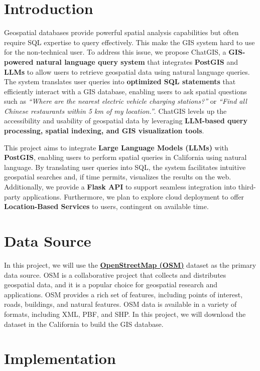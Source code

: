 \documentclass{article}
\begin{document}
\section{Introduction}

Geospatial databases provide powerful spatial analysis capabilities but often require SQL expertise to query effectively. This make the GIS system hard to use for the non-technical user. To address this issue, we propose ChatGIS, a \textbf{GIS-powered natural language query system} that integrates \textbf{PostGIS} and \textbf{LLMs} to allow users to retrieve geospatial data using natural language queries. The system translates user queries into \textbf{optimized SQL statements} that efficiently interact with a GIS database, enabling users to ask spatial questions such as \textit{``Where are the nearest electric vehicle charging stations?''} or \textit{``Find all Chinese restaurants within 5 km of my location.''}. ChatGIS levels up the accessibility and usability of geospatial data by leveraging \textbf{LLM-based query processing, spatial indexing, and GIS visualization tools}.

This project aims to integrate \textbf{Large Language Models (LLMs)} with \textbf{PostGIS}, enabling users to perform spatial queries in California using natural language. By translating user queries into SQL, the system facilitates intuitive geospatial searches and, if time permits, visualizes the results on the web. Additionally, we provide a \textbf{Flask API} to support seamless integration into third-party applications. Furthermore, we plan to explore cloud deployment to offer \textbf{Location-Based Services} to users, contingent on available time.

\section{Data Source}

In this project, we will use the \textbf{\href{https://www.openstreetmap.org}{OpenStreetMap (OSM)}} dataset as the primary data source. OSM is a collaborative project that collects and distributes geospatial data, and it is a popular choice for geospatial research and applications. OSM provides a rich set of features, including points of interest, roads, buildings, and natural features. OSM data is available in a variety of formats, including XML, PBF, and SHP. In this project, we will download the dataset in the California to build the GIS database.

\section{Implementation}
\end{document}
